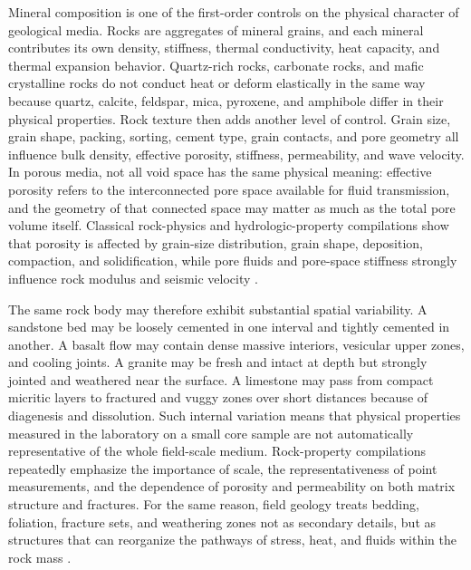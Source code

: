 Mineral composition is one of the first-order controls on the physical character of geological media. Rocks are aggregates of mineral grains, and each mineral contributes its own density, stiffness, thermal conductivity, heat capacity, and thermal expansion behavior. Quartz-rich rocks, carbonate rocks, and mafic crystalline rocks do not conduct heat or deform elastically in the same way because quartz, calcite, feldspar, mica, pyroxene, and amphibole differ in their physical properties. Rock texture then adds another level of control. Grain size, grain shape, packing, sorting, cement type, grain contacts, and pore geometry all influence bulk density, effective porosity, stiffness, permeability, and wave velocity. In porous media, not all void space has the same physical meaning: effective porosity refers to the interconnected pore space available for fluid transmission, and the geometry of that connected space may matter as much as the total pore volume itself. Classical rock-physics and hydrologic-property compilations show that porosity is affected by grain-size distribution, grain shape, deposition, compaction, and solidification, while pore fluids and pore-space stiffness strongly influence rock modulus and seismic velocity \cite{wolff1982,mavko2009,robertson1988}.

The same rock body may therefore exhibit substantial spatial variability. A sandstone bed may be loosely cemented in one interval and tightly cemented in another. A basalt flow may contain dense massive interiors, vesicular upper zones, and cooling joints. A granite may be fresh and intact at depth but strongly jointed and weathered near the surface. A limestone may pass from compact micritic layers to fractured and vuggy zones over short distances because of diagenesis and dissolution. Such internal variation means that physical properties measured in the laboratory on a small core sample are not automatically representative of the whole field-scale medium. Rock-property compilations repeatedly emphasize the importance of scale, the representativeness of point measurements, and the dependence of porosity and permeability on both matrix structure and fractures. For the same reason, field geology treats bedding, foliation, fracture sets, and weathering zones not as secondary details, but as structures that can reorganize the pathways of stress, heat, and fluids within the rock mass \cite{wolff1982,robertson1988,schultz2019}.

